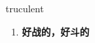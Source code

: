 
\begin{frame}
{\huge truculent}
\begin{center}
\begin{enumerate}\Large
  \item \textbf{好战的，好斗的}
\end{enumerate}
\end{center}
\end{frame}
